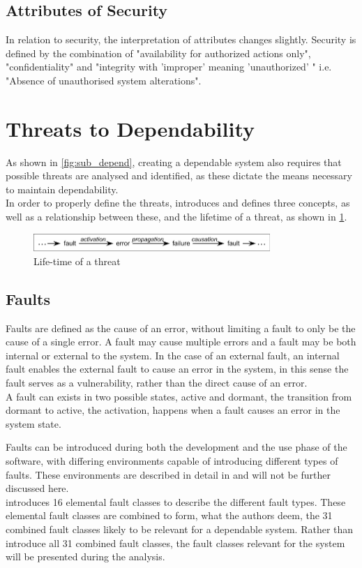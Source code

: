 \subsection{Attributes of Security}
In relation to security, the interpretation of attributes changes slightly.
Security is defined by the combination of "availability for authorized actions only", "confidentiality" and "integrity with 'improper' meaning 'unauthorized' " i.e. "Absence of unauthorised system alterations".\autocite{rts_depend}

\section{Threats to Dependability}
As shown in \cref{fig:sub_depend}, creating a dependable system also requires that possible threats are analysed and identified, as these dictate the means necessary to maintain dependability. \\
In order to properly define the threats, \textcite{rts_depend} introduces and defines three concepts,
as well as a relationship between these, and the lifetime of a threat, as shown in \cref{fig:rts_threat_life}.

\begin{figure}[ht]
  \centering
  \includegraphics[width=0.8\textwidth]{graphics/depend3.png}
  \caption{Life-time of a threat\autocite{rts_depend}}
  \label{fig:rts_threat_life}
\end{figure}

\subsection{Faults}
Faults are defined as the cause of an error, without limiting a fault to only be the cause of a single error.
A fault may cause multiple errors and a fault may be both internal or external to the system.
In the case of an external fault, an internal fault enables the external fault to cause an error in the system, in this sense the fault serves as a vulnerability, rather than the direct cause of an error.\\
A fault can exists in two possible states, active and dormant, the transition from dormant to active, the activation, happens when a fault causes an error in the system state.

Faults can be introduced during both the development and the use phase of the software, with differing environments capable of introducing different types of faults.
These environments are described in detail in \autocite[14]{rts_depend} and will not be further discussed here.\\
\textcite{rts_depend} introduces 16 elemental fault classes to describe the different fault types.
These elemental fault classes are combined to form, what the authors deem, the 31 combined fault classes likely to be relevant for a dependable system.
Rather than introduce all 31 combined fault classes, the fault classes relevant for the system will be presented during the analysis.

